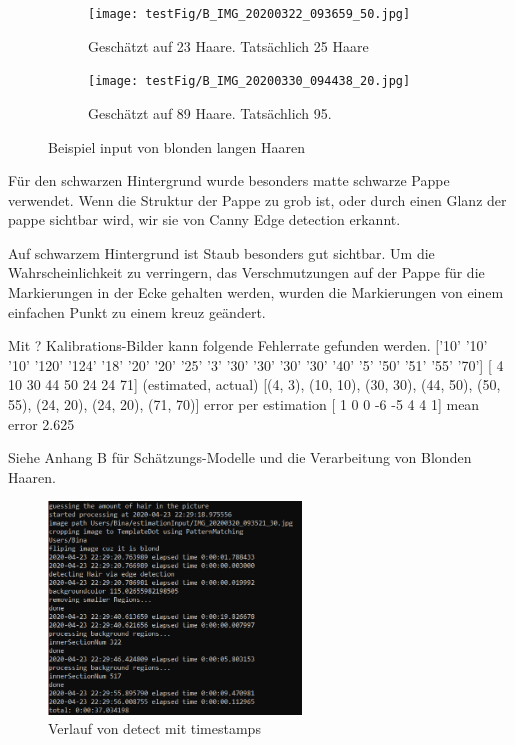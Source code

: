 \documentclass[german,a4paper, 12pt]{llncs}
\begin{document}
\begin{figure}
	\centering
	\begin{subfigure}[b]{0.475\textwidth}
		\centering
		\texttt{[image: testFig/B\_IMG\_20200322\_093659\_50.jpg]}
		\caption[]{Geschätzt auf 23 Haare. Tatsächlich 25 Haare}
		\label{img:tstM1} 
	\end{subfigure}
	\hfill
	\begin{subfigure}[b]{0.475\textwidth} 
		\centering
		\texttt{[image: testFig/B\_IMG\_20200330\_094438\_20.jpg]}
		\caption[]{Geschätzt auf 89 Haare. Tatsächlich 95.}
		\label{img:tstM2}
	\end{subfigure}
	\caption[  ]
	{\small Beispiel input von blonden langen Haaren} 
	\label{img:tstM}
\end{figure}
Für den schwarzen Hintergrund wurde besonders matte schwarze Pappe verwendet. Wenn die Struktur der Pappe zu grob ist, oder durch einen Glanz der pappe sichtbar wird, wir sie von Canny Edge detection erkannt. 

Auf schwarzem Hintergrund ist Staub besonders gut sichtbar. Um die Wahrscheinlichkeit zu verringern, das Verschmutzungen auf der Pappe für die Markierungen in der Ecke gehalten werden, wurden die Markierungen von einem einfachen Punkt zu einem kreuz geändert.  

Mit ? Kalibrations-Bilder kann folgende Fehlerrate gefunden werden.
['10' '10' '10' '120' '124' '18' '20' '20' '25' '3' '30' '30' '30' '30'
'40' '5' '50' '51' '55' '70']
[ 4 10 30 44 50 24 24 71]
(estimated, actual)
[(4, 3), (10, 10), (30, 30), (44, 50), (50, 55), (24, 20), (24, 20), (71, 70)]
error per estimation [ 1  0  0 -6 -5  4  4  1]
mean error 2.625

Siehe Anhang B für Schätzungs-Modelle und die Verarbeitung von Blonden Haaren.

\begin{figure}[H]
	\centering
	\includegraphics[width=0.6\textwidth]{figBina/time.png}
	\caption[]{Verlauf von detect mit timestamps}
	\label{img:time2}
\end{figure} 
\end{document}
